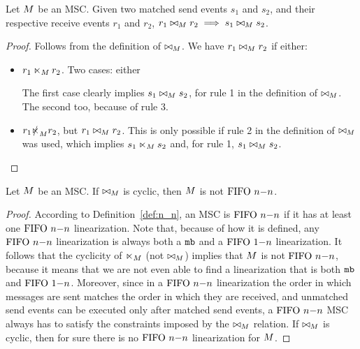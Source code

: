 \begin{proposition}
	Let $M$ be an MSC. Given two matched send events $s_1$ and $s_2$, and their respective receive events $r_1$ and $r_2$, $r_1 \bowtie_M r_2 \implies s_1 \bowtie_M s_2$.
\end{proposition}
\begin{proof}
Follows from the definition of $\bowtie_M$. We have $r_1 \bowtie_M r_2$ if either:
\begin{itemize}%
	\item $r_1 \ltimes_M r_2$. Two cases: either \begin{enumerate*}[label={(\roman*)}]
		\item $s_1 \nnrel_\msc s_2$, or 
		\item $s_1 \slashed{\nnrel}_\msc s_2$.
	\end{enumerate*}
	The first case clearly implies $s_1 \bowtie_M s_2$, for rule 1 in the definition of $\bowtie_M$. The second too, because of rule 3.
	\item  $r_1 \slashed{\ltimes}_M r_2$, but $r_1 \bowtie_M r_2$. This is only possible if rule 2 in the definition of $\bowtie_M$ was used, which implies $s_1 \nnrel_\msc s_2$ and, for rule 1, $s_1 \bowtie_M s_2$.
\end{itemize}
\end{proof}

\begin{proposition}\label{prop:n_n_cycl}
	Let $M$ be an MSC. If $\bowtie_M$ is cyclic, then $M$ is not $\text{FIFO } n\mathsf{-}n$.
\end{proposition}
\begin{proof}
According to Definition~\ref{def:n_n}, an MSC is $\text{FIFO } n\mathsf{-}n$ if it has at least one $\text{FIFO } n\mathsf{-}n$ linearization. Note that, because of how it is defined, any $\text{FIFO } n\mathsf{-}n$ linearization is always both a $\mathtt{mb}$ and a $\text{FIFO } 1\mathsf{-}n$ linearization. It follows that the cyclicity of $\ltimes_M$ (not $\bowtie_M$) implies that $M$ is not $\text{FIFO } n\mathsf{-}n$, because it means that we are not even able to find a linearization that is both $\mathtt{mb}$ and $\text{FIFO } 1\mathsf{-}n$. Moreover, since in a $\text{FIFO } n\mathsf{-}n$ linearization the order in which messages are sent matches the order in which they are received, and unmatched send events can be executed only after matched send events, a $\text{FIFO } n\mathsf{-}n$ MSC always has to satisfy the constraints imposed by the $\bowtie_M$ relation. If $\bowtie_M$ is cyclic, then for sure there is no $\text{FIFO } n\mathsf{-}n$ linearization for $M$.
\end{proof}

